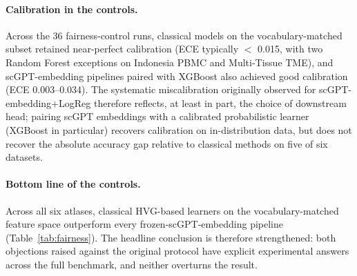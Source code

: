 \documentclass[11pt,a4paper]{article}
\begin{document}
\paragraph{Calibration in the controls.} Across the 36 fairness-control runs, classical models on the vocabulary-matched subset retained near-perfect calibration (ECE typically $<$ 0.015, with two Random Forest exceptions on Indonesia PBMC and Multi-Tissue TME), and scGPT-embedding pipelines paired with XGBoost also achieved good calibration (ECE 0.003--0.034). The systematic miscalibration originally observed for scGPT-embedding+LogReg therefore reflects, at least in part, the choice of downstream head; pairing scGPT embeddings with a calibrated probabilistic learner (XGBoost in particular) recovers calibration on in-distribution data, but does not recover the absolute accuracy gap relative to classical methods on five of six datasets.

\paragraph{Bottom line of the controls.} Across all six atlases, classical HVG-based learners on the vocabulary-matched feature space outperform every frozen-scGPT-embedding pipeline (Table~\ref{tab:fairness}). The headline conclusion is therefore strengthened: both objections raised against the original protocol have explicit experimental answers across the full benchmark, and neither overturns the result.
\end{document}
